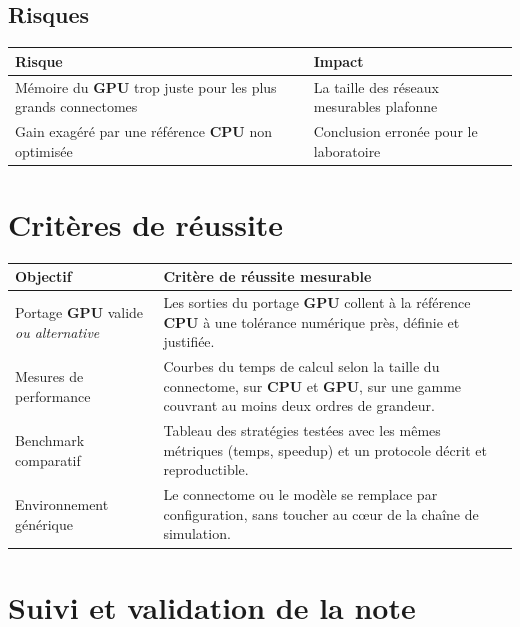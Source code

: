 \section{Risques}

\begin{longtable}{|p{6.8cm}|p{7.8cm}|}
\hline
\textbf{Risque} & \textbf{Impact} \\ \hline
Mémoire du \textbf{GPU} trop juste pour les plus grands connectomes &
La taille des réseaux mesurables plafonne \\ \hline

Gain exagéré par une référence \textbf{CPU} non optimisée &
Conclusion erronée pour le laboratoire \\ \hline

\end{longtable}

\chapter{Critères de réussite}

\begin{longtable}{|p{5.5cm}|p{9.5cm}|}
\hline
\textbf{Objectif} & \textbf{Critère de réussite mesurable} \\ \hline

Portage \textbf{GPU} valide \textit{ou alternative} &
Les sorties du portage \textbf{GPU} collent à la référence \textbf{CPU} à une tolérance numérique près, définie et justifiée. \\ \hline

Mesures de performance &
Courbes du temps de calcul selon la taille du connectome, sur \textbf{CPU} et \textbf{GPU}, sur une gamme couvrant au moins deux ordres de grandeur. \\ \hline

Benchmark comparatif &
Tableau des stratégies testées avec les mêmes métriques (temps, speedup) et un protocole décrit et reproductible. \\ \hline

Environnement générique &
Le connectome ou le modèle se remplace par configuration, sans toucher au cœur de la chaîne de simulation. \\ \hline

\end{longtable}

\chapter{Suivi et validation de la note}

